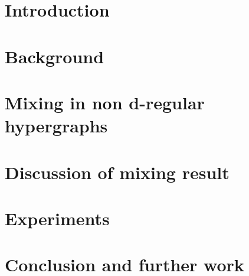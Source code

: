 \documentclass[a4paper]{article}
\begin{document}
\section{Introduction} %
\label{sec:introduction}


\section{Background}
\label{sec:background}


\section{Mixing in non d-regular hypergraphs}
\label{sec:extensions_non_d_reg_hypergraphs}


\section{Discussion of mixing result}
\label{sec:discussion}


\section{Experiments}
\label{sec:experiments}


\section{Conclusion and further work}
\label{sec:conclusion}


\appendix

\newpage 


\end{document}
